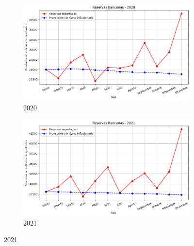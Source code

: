 \begin{figure}[H]
  \begin{subfigure}[b]{0.495\textwidth}
    \includegraphics[width=\linewidth]{imagenes/retro_2020.png}
    \caption{2020}
  \end{subfigure}
  \begin{subfigure}[b]{0.495\textwidth}
    \includegraphics[width=\linewidth]{imagenes/retro_2021.png}
    \caption{2021}
  \end{subfigure}
  

\end{figure}
